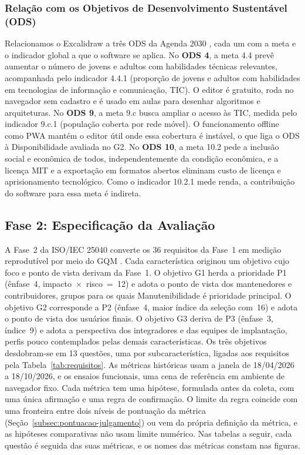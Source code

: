 \documentclass[12pt]{article}
\begin{document}
\subsubsection{Relação com os Objetivos de Desenvolvimento Sustentável (ODS)}

Relacionamos o Excalidraw a três ODS da Agenda 2030 \cite{onu2015ods}, cada um com a meta e o indicador global \cite{unsd2025indicadores} a que o software se aplica. No \textbf{ODS 4}, a meta 4.4 prevê aumentar o número de jovens e adultos com habilidades técnicas relevantes, acompanhada pelo indicador 4.4.1 (proporção de jovens e adultos com habilidades em tecnologias de informação e comunicação, TIC). O editor é gratuito, roda no navegador sem cadastro e é usado em aulas para desenhar algoritmos e arquiteturas. No \textbf{ODS 9}, a meta 9.c busca ampliar o acesso às TIC, medida pelo indicador 9.c.1 (população coberta por rede móvel). O funcionamento offline como PWA mantém o editor útil onde essa cobertura é instável, o que liga o ODS à Disponibilidade avaliada no G2. No \textbf{ODS 10}, a meta 10.2 pede a inclusão social e econômica de todos, independentemente da condição econômica, e a licença MIT e a exportação em formatos abertos eliminam custo de licença e aprisionamento tecnológico. Como o indicador 10.2.1 mede renda, a contribuição do software para essa meta é indireta.

\subsection{Fase 2: Especificação da Avaliação}
\label{sec:fase2}
\label{subsec:fase2}

A Fase~2 da ISO/IEC 25040 \cite{iso25040} converte os 36 requisitos da Fase~1 em medição reprodutível por meio do GQM \cite{basili1994gqm}. Cada característica originou um objetivo cujo foco e ponto de vista derivam da Fase~1. O objetivo G1 herda a prioridade P1 (ênfase~4, impacto~$\times$~risco~=~12) e adota o ponto de vista dos mantenedores e contribuidores, grupos para os quais Manutenibilidade é prioridade principal. O objetivo G2 corresponde a P2 (ênfase~4, maior índice da seleção com~16) e adota o ponto de vista dos usuários finais. O objetivo G3 deriva de P3 (ênfase~3, índice~9) e adota a perspectiva dos integradores e das equipes de implantação, perfis pouco contemplados pelas demais características. Os três objetivos desdobram-se em 13 questões, uma por subcaracterística, ligadas aos requisitos pela Tabela~\ref{tab:requisitos}. As métricas históricas usam a janela de 18/04/2026 a 18/10/2026, e os ensaios funcionais, uma cena de referência em ambiente de navegador fixo. Cada métrica tem uma hipótese, formulada antes da coleta, com uma única afirmação e uma regra de confirmação. O limite da regra coincide com uma fronteira entre dois níveis de pontuação da métrica (Seção~\ref{subsec:pontuacao-julgamento}) ou vem da própria definição da métrica, e as hipóteses comparativas não usam limite numérico. Nas tabelas a seguir, cada questão é seguida das suas métricas, e os nomes das métricas constam nas figuras.
\end{document}
